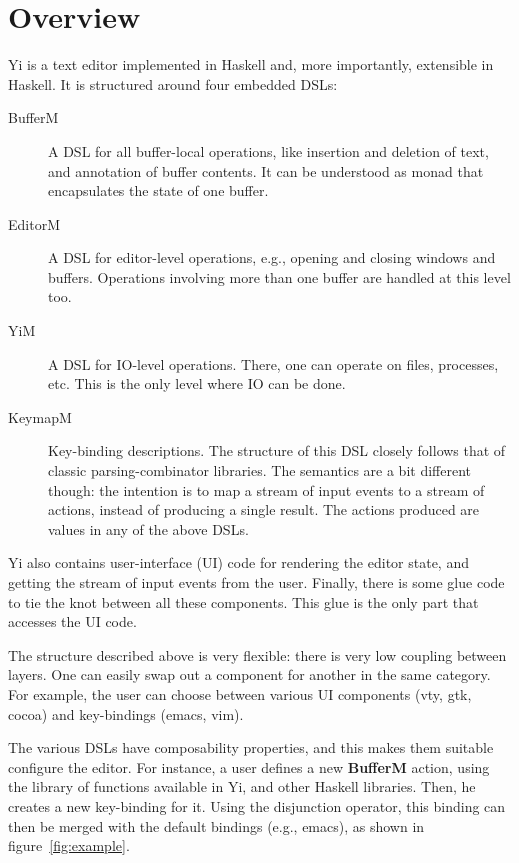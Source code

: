 \documentclass[9pt,indentedstyle,preprint]{sigplanconf}
\begin{document}
\section{Overview}

Yi is a text editor implemented in Haskell and, more importantly, extensible in
Haskell. It is structured around four embedded DSLs:
\begin{description}
\item[BufferM] A DSL for all buffer-local operations, like insertion
  and deletion of text, and annotation of buffer contents. It
  can be understood as monad that encapsulates the state of one buffer.
\item[EditorM] A DSL for editor-level operations, e.g., opening and closing
  windows and buffers. Operations involving more than one buffer are
  handled at this level too.
\item[YiM] A DSL for IO-level operations. There, one can operate on files,
  processes, etc.  This is the only level where IO can be done.
\item[KeymapM] Key-binding descriptions. The structure of this DSL
  closely follows that of classic parsing-combinator libraries.  The
  semantics are a bit different though: the intention is to map a
  stream of input events to a stream of actions, instead of producing
  a single result. The actions produced are values in any of the above
  DSLs.
\end{description}
Yi also contains user-interface (UI) code for rendering the editor
state, and getting the stream of input events from the user.  Finally,
there is some glue code to tie the knot between all these
components. This glue is the only part that accesses the UI code.

The structure described above is very flexible: there is very low coupling between
layers. One can easily swap out a component for another in the same
category. For example, the user can choose between various UI
components (vty, gtk, cocoa) and key-bindings (emacs, vim).

The various DSLs have composability properties, and this makes them
suitable configure the editor. For instance, a user 
defines a new \textbf{BufferM} action, using the library of functions available
in Yi, and other Haskell libraries. Then, he creates a new
key-binding for it. Using the disjunction operator, this binding can
then be merged with the default bindings (e.g., emacs), as shown 
in figure~\ref{fig:example}.
\end{document}
